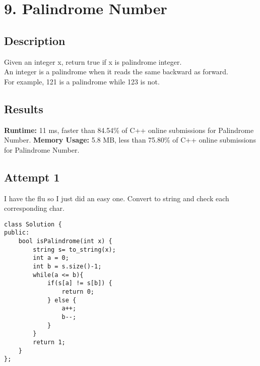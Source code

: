 \chapter{9. Palindrome Number}
\section{Description}
Given an integer x, return true if x is palindrome integer.
\\
An integer is a palindrome when it reads the same backward as forward.
\\
For example, 121 is a palindrome while 123 is not.
\section{Results}
\textbf{Runtime:}
11 ms, faster than 84.54\% of C++ online submissions for Palindrome Number.
\textbf{Memory Usage:}
5.8 MB, less than 75.80\% of C++ online submissions for Palindrome Number.
\newpage
\section{Attempt 1}
I have the flu so I just did an easy one. Convert to string and check each corresponding char.
\begin{lstlisting}
class Solution {
public:
    bool isPalindrome(int x) {
        string s= to_string(x);
        int a = 0;
        int b = s.size()-1;
        while(a <= b){
            if(s[a] != s[b]) {
                return 0;
            } else {
                a++;
                b--;
            }
        }
        return 1;
    }
};
\end{lstlisting}
